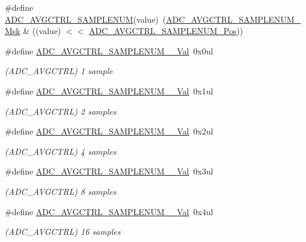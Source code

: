 \begin{DoxyCompactItemize}
\item 
\#define \mbox{\hyperlink{group___s_a_m_d21___a_d_c_gad3b73cbf367201bc6ccea836a008b069}{A\+D\+C\+\_\+\+A\+V\+G\+C\+T\+R\+L\+\_\+\+S\+A\+M\+P\+L\+E\+N\+UM}}(value)~(\mbox{\hyperlink{group___s_a_m_d21___a_d_c_ga10a4df299fe2d9a69e31fd85e120ea4e}{A\+D\+C\+\_\+\+A\+V\+G\+C\+T\+R\+L\+\_\+\+S\+A\+M\+P\+L\+E\+N\+U\+M\+\_\+\+Msk}} \& ((value) $<$$<$ \mbox{\hyperlink{group___s_a_m_d21___a_d_c_gae24ef894295278762f9293105f06ffb9}{A\+D\+C\+\_\+\+A\+V\+G\+C\+T\+R\+L\+\_\+\+S\+A\+M\+P\+L\+E\+N\+U\+M\+\_\+\+Pos}}))
\item 
\#define \mbox{\hyperlink{group___s_a_m_d21___a_d_c_ga9e70c7b0cd6dbf66fd9a26c9f664c094}{A\+D\+C\+\_\+\+A\+V\+G\+C\+T\+R\+L\+\_\+\+S\+A\+M\+P\+L\+E\+N\+U\+M\+\_\+\_\+\+Val}}~0x0ul
\begin{DoxyCompactList}\small\item\em (A\+D\+C\+\_\+\+A\+V\+G\+C\+T\+RL) 1 sample \end{DoxyCompactList}\item 
\#define \mbox{\hyperlink{group___s_a_m_d21___a_d_c_ga02a97329331932ee77e50645ba2af513}{A\+D\+C\+\_\+\+A\+V\+G\+C\+T\+R\+L\+\_\+\+S\+A\+M\+P\+L\+E\+N\+U\+M\+\_\+\_\+\+Val}}~0x1ul
\begin{DoxyCompactList}\small\item\em (A\+D\+C\+\_\+\+A\+V\+G\+C\+T\+RL) 2 samples \end{DoxyCompactList}\item 
\#define \mbox{\hyperlink{group___s_a_m_d21___a_d_c_ga2a0b01d83c38d590419a36959b3bb785}{A\+D\+C\+\_\+\+A\+V\+G\+C\+T\+R\+L\+\_\+\+S\+A\+M\+P\+L\+E\+N\+U\+M\+\_\+\_\+\+Val}}~0x2ul
\begin{DoxyCompactList}\small\item\em (A\+D\+C\+\_\+\+A\+V\+G\+C\+T\+RL) 4 samples \end{DoxyCompactList}\item 
\#define \mbox{\hyperlink{group___s_a_m_d21___a_d_c_gaccc8c475aeda72ace654784ec4586bf3}{A\+D\+C\+\_\+\+A\+V\+G\+C\+T\+R\+L\+\_\+\+S\+A\+M\+P\+L\+E\+N\+U\+M\+\_\+\_\+\+Val}}~0x3ul
\begin{DoxyCompactList}\small\item\em (A\+D\+C\+\_\+\+A\+V\+G\+C\+T\+RL) 8 samples \end{DoxyCompactList}\item 
\#define \mbox{\hyperlink{group___s_a_m_d21___a_d_c_ga5edfb4fb05fa1c6854f3bf7e1be6f325}{A\+D\+C\+\_\+\+A\+V\+G\+C\+T\+R\+L\+\_\+\+S\+A\+M\+P\+L\+E\+N\+U\+M\+\_\+\_\+\+Val}}~0x4ul
\begin{DoxyCompactList}\small\item\em (A\+D\+C\+\_\+\+A\+V\+G\+C\+T\+RL) 16 samples \end{DoxyCompactList}\item 
$$
\end{DoxyCompactItemize}
